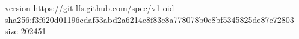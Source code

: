version https://git-lfs.github.com/spec/v1
oid sha256:f3f620d01196cdaf53abd2a6214c8f83c8a778078b0c8bf5345825de87e72803
size 202451
